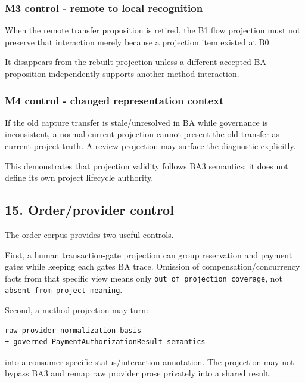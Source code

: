 \documentclass[11pt,a4paper]{article}
\begin{document}
\subsubsection{M3 control - remote to local recognition}\label{m3-control---remote-to-local-recognition}

When the remote transfer proposition is retired, the B1 flow projection must not preserve that interaction merely because a projection item existed at B0.

It disappears from the rebuilt projection unless a different accepted BA proposition independently supports another method interaction.

\subsubsection{M4 control - changed representation context}\label{m4-control---changed-representation-context}

If the old capture transfer is stale/unresolved in BA while governance is inconsistent, a normal current projection cannot present the old transfer as current project truth. A review projection may surface the diagnostic explicitly.

This demonstrates that projection validity follows BA3 semantics; it does not define its own project lifecycle authority.

\subsection{15. Order/provider control}\label{15-orderprovider-control}

The order corpus provides two useful controls.

First, a human transaction-gate projection can group reservation and payment gates while keeping each gate\textquotesingle s BA trace. Omission of compensation/concurrency facts from that specific view means only \texttt{out\ of\ projection\ coverage}, not \texttt{absent\ from\ project\ meaning}.

Second, a method projection may turn:

\begin{verbatim}
raw provider normalization basis
+ governed PaymentAuthorizationResult semantics
\end{verbatim}

into a consumer-specific status/interaction annotation. The projection may not bypass BA3 and remap raw provider prose privately into a shared result.
\end{document}
